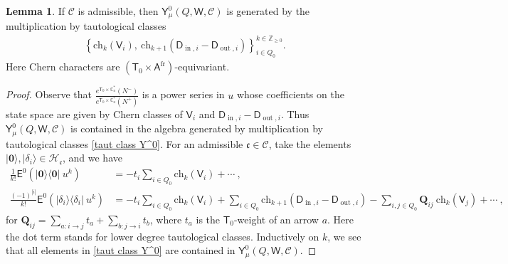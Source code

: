 \documentclass[10pt]{amsart}
\theoremstyle{definition}
\newtheorem{Lemma}[Theorem]{Lemma}
\numberwithin{equation}{section}
\newcommand{\bC}{\mathbb{C}}
\newcommand{\bZ}{\mathbb{Z}}
\newcommand{\bv}{\mathbf{v}}
\newcommand{\bd}{\mathbf{d}}
\newcommand{\cH}{\mathcal{H}}
\newcommand{\sA}{\mathsf{A}}
\newcommand{\sT}{\mathsf{T}}
\newcommand{\sW}{\mathsf{W}}
\newcommand{\In}{\operatorname{in}}
\newcommand{\Out}{\operatorname{out}}
\begin{document}
\begin{Lemma}\label{lem Y^0 generators}
If $\mathcal C$ is admissible, then $\mathsf Y^0_\mu(Q,\sW,\mathcal C)$ is generated by the multiplication by tautological classes
\begin{align}\label{taut class Y^0}
    \left\{\mathrm{ch}_k(\mathsf V_i),\:\mathrm{ch}_{k+1}(\mathsf D_{\In,i}-\mathsf D_{\Out,i})\right\}_{i\in Q_0}^{k\in \bZ_{\geqslant 0}}.
\end{align}
Here Chern characters are $(\sT_0\times \sA^{\text{fr}})$-equivariant.
\end{Lemma}

\begin{proof}
Observe that $\frac{e^{\sT_0\times \bC^*_u}(N^-)}{e^{\sT_0\times \bC^*_u}(N^+)}$ is a power series in $u$ whose coefficients on the state space are given by Chern classes of $\mathsf V_i$ and $\mathsf D_{\In,i}-\mathsf D_{\Out,i}$. Thus $\mathsf Y^0_\mu(Q,\sW,\mathcal C)$ is contained in the algebra generated by multiplication by tautological classes \eqref{taut class Y^0}. For an admissible $\mathfrak{c}\in \mathcal C$, take the elements $|\mathbf 0\rangle,|\delta_i\rangle\in \mathcal H_{\mathfrak{c}}$, and we have
\begin{align*}
\frac{1}{k!}\mathsf E^0(|\mathbf 0\rangle\langle\mathbf 0|\:u^k)&=-t_i\sum_{i\in Q_0}\mathrm{ch}_k(\mathsf V_i)+\cdots\:,\\
\frac{(-1)^{|i|}}{k!}\mathsf E^0(|\delta_i\rangle\langle\delta_i|\:u^k)&=-t_i\sum_{i\in Q_0}\mathrm{ch}_k(\mathsf V_i)+\sum_{i\in Q_0}\mathrm{ch}_{k+1}(\mathsf D_{\In,i}-\mathsf D_{\Out,i})-\sum_{i,j\in Q_0}\pmb Q_{ij}\:\mathrm{ch}_k(\mathsf V_j)+\cdots\:,
\end{align*}
for $\pmb Q_{ij}=\sum_{a:i\to j}t_a+\sum_{b:j\to i}t_b$, where $t_a$ is the $\sT_0$-weight of an arrow $a$. Here the dot term stands for lower degree tautological classes. Inductively on $k$, we see that all elements in \eqref{taut class Y^0} are contained in $\mathsf Y^0_\mu(Q,\sW,\mathcal C)$.
\end{proof}
\end{document}
